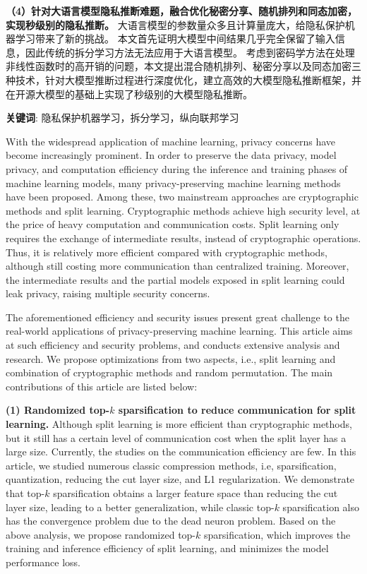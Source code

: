 \textbf{（4）针对大语言模型隐私推断难题，融合优化秘密分享、随机排列和同态加密，实现秒级别的隐私推断。}
大语言模型的参数量众多且计算量庞大，给隐私保护机器学习带来了新的挑战。
本文首先证明大模型中间结果几乎完全保留了输入信息，因此传统的拆分学习方法无法应用于大语言模型。
考虑到密码学方法在处理非线性函数时的高开销的问题，本文提出混合随机排列、秘密分享以及同态加密三种技术，针对大模型推断过程进行深度优化，建立高效的大模型隐私推断框架，并在开源大模型的基础上实现了秒级别的大模型隐私推断。

\noindent \textbf{关键词}: 隐私保护机器学习，拆分学习，纵向联邦学习


\cleardoublepage
{}
With the widespread application of machine learning, privacy concerns have become increasingly prominent.
In order to preserve the data privacy, model privacy, and computation efficiency during the inference and training phases of machine learning models, many privacy-preserving machine learning methods have been proposed.
%
Among these, two mainstream approaches are cryptographic methods and split learning.
%
Cryptographic methods achieve high security level, at the price of heavy computation and communication costs.
%
Split learning only requires the exchange of intermediate results, instead of cryptographic operations.
Thus, it is relatively more efficient compared with cryptographic methods, although still costing more communication than centralized training.
Moreover, the intermediate results and the partial models exposed in split learning could leak privacy, raising multiple security concerns.

The aforementioned efficiency and security issues present great challenge to the real-world applications of privacy-preserving machine learning.
%
This article aims at such efficiency and security problems, and conducts extensive analysis and research.
%
We propose optimizations from two aspects, i.e., split learning and combination of cryptographic methods and random permutation.
%
The main contributions of this article are listed below:


\textbf{(1) Randomized top-$k$ sparsification to reduce communication for split learning.}
Although split learning is more efficient than cryptographic methods, but it still has a certain level of communication cost when the split layer has a large size.
Currently, the studies on the communication efficiency are few.
%
In this article, we studied numerous classic compression methods, i.e, sparsification, quantization, reducing the cut layer size, and L1 regularization.
%
We demonstrate that top-$k$ sparsification obtains a larger feature space than reducing the cut layer size, leading to a better generalization, while classic top-$k$ sparsification also has the convergence problem due to the dead neuron problem.
%
Based on the above analysis, we propose randomized top-$k$ sparsification, which improves the training and inference efficiency of split learning, and minimizes the model performance loss.
%

